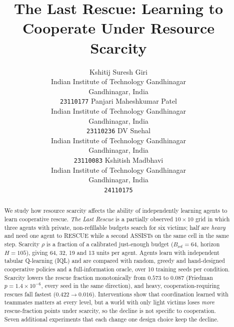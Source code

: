 \documentclass{article}
\title{The Last Rescue: Learning to Cooperate Under Resource Scarcity}
\author{
  Kshitij Suresh Giri\\
  Indian Institute of Technology Gandhinagar\\
  Gandhinagar, India\\
  \texttt{23110177}
  \And
  Panjari Maheshkumar Patel\\
  Indian Institute of Technology Gandhinagar\\
  Gandhinagar, India\\
  \texttt{23110236}
  \AND
  DV Snehal\\
  Indian Institute of Technology Gandhinagar\\
  Gandhinagar, India\\
  \texttt{23110083}
  \And
  Kshitish Madbhavi\\
  Indian Institute of Technology Gandhinagar\\
  Gandhinagar, India\\
  \texttt{24110175}
}
\date{}
\newcommand{\Bref}{B_{\mathrm{ref}}}
\begin{document}
\maketitle

\begin{abstract}
We study how resource scarcity affects the ability of independently learning agents to learn cooperative rescue.
\emph{The Last Rescue} is a partially observed $10\times10$ grid in which three agents with private, non-refillable
budgets search for six victims; half are \emph{heavy} and need one agent to RESCUE while a second ASSISTs on the same
cell in the same step. Scarcity $\rho$ is a fraction of a calibrated just-enough budget ($\Bref=64$, horizon $H=105$),
giving 64, 32, 19 and 13 units per agent. Agents learn with independent tabular Q-learning (IQL) and are compared with
random, greedy and hand-designed cooperative policies and a full-information oracle, over 10 training seeds per
condition. Scarcity lowers the rescue fraction monotonically from $0.573$ to $0.087$ (Friedman $p=1.4\times10^{-6}$,
every seed in the same direction), and heavy, cooperation-requiring rescues fall fastest ($0.422\to0.016$).
Interventions show that coordination learned with teammates matters at every level, but a world with only light victims
loses \emph{more} rescue-fraction points under scarcity, so the decline is not specific to cooperation. Seven
additional experiments that each change one design choice keep the decline.
\end{abstract}


\end{document}
